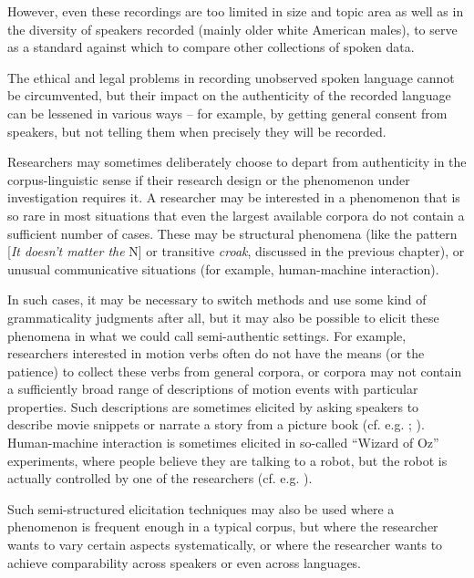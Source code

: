 However, even these recordings are too limited in size  and topic area as well as in the diversity of speakers recorded (mainly older white American males), to serve as a standard against which to compare other collections of spoken  data.

The ethical and legal problems in recording unobserved spoken  language cannot be circumvented, but their impact on the authenticity  of the recorded language can be lessened in various ways -- for example, by getting general consent from speakers, but not telling them when precisely they will be recorded.

Researchers may sometimes deliberately choose to depart from authenticity  in the corpus\hyp{}linguistic sense if their research design  or the phenomenon under investigation requires it. A researcher may be interested in a phenomenon that is so rare in most situations that even the largest  available corpora do not contain a sufficient number of cases. These may be structural phenomena (like the pattern [\textit{It doesn't matter the} N] or transitive  \textit{croak}, discussed in the previous chapter), or unusual communicative situations (for example, human\hyp{}machine interaction).

In such cases, it may be necessary to switch methods and use some kind of grammaticality  judgments after all, but it may also be possible to elicit  these phenomena in what we could call semi\hyp{}authentic  settings. For example, researchers interested in motion verbs  often do not have the means (or the patience) to collect these verbs from general corpora, or corpora may not contain a sufficiently broad range of descriptions of motion events with particular properties. Such descriptions are sometimes elicited by asking speakers to describe movie snippets or narrate a story from a picture book (cf. e.g. \citealt{berman_relating_1994}; \citealt{stromqvist_relating_2003}). Human\hyp{}machine interaction is sometimes elicited  in so\hyp{}called ``Wizard of Oz'' experiments,  where people believe they are talking to a robot, but the robot is actually controlled by one of the researchers (cf. e.g. \citealt{georgila_match_2010}).

Such semi\hyp{}structured elicitation  techniques may also be used where a phenomenon is frequent enough in a typical corpus, but where the researcher wants to vary certain aspects systematically, or where the researcher wants to achieve comparability across speakers or even across languages.

